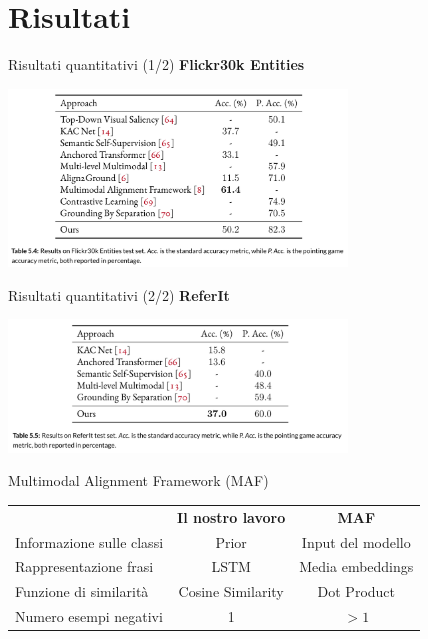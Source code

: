 \documentclass{beamer}
\begin{document}
\section{Risultati}

\begin{frame}{Risultati quantitativi (1/2)}
  \textbf{Flickr30k Entities}
  \begin{center}
    \includegraphics[width=9cm]{images/flickr30k-results.png}
  \end{center}
\end{frame}

\begin{frame}{Risultati quantitativi (2/2)}
  \textbf{ReferIt}
  \begin{center}
    \includegraphics[width=9cm]{images/referit-results.png}
  \end{center}
\end{frame}

\begin{frame}{Multimodal Alignment Framework (MAF)}
  \begin{center}
    \begin{tabular}{p{4cm}cc} 
       & \textbf{Il nostro lavoro} & \textbf{MAF} \\
      \addlinespace
      Informazione sulle classi & Prior & Input del modello \\ 
      Rappresentazione frasi & LSTM & Media embeddings \\
      Funzione di similarità & Cosine Similarity & Dot Product \\
      Numero esempi negativi & 1 & $> 1$ \\ 
    \end{tabular}
  \end{center}
\end{frame}
\end{document}
